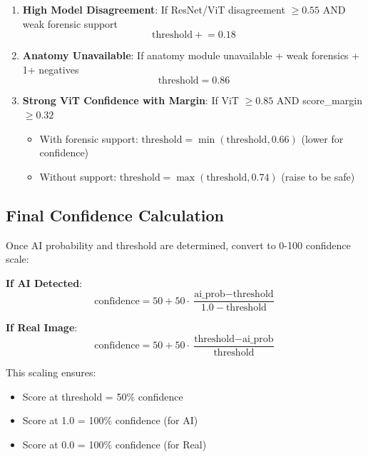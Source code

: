 \documentclass[12pt,a4paper]{book}
\begin{document}
\begin{enumerate}
    \item \textbf{High Model Disagreement}: If ResNet/ViT disagreement $\geq 0.55$ AND weak forensic support
    \begin{equation}
    \text{threshold} \mathrel{+}= 0.18
    \end{equation}
    
    \item \textbf{Anatomy Unavailable}: If anatomy module unavailable + weak forensics + 1+ negatives
    \begin{equation}
    \text{threshold} = 0.86
    \end{equation}
    
    \item \textbf{Strong ViT Confidence with Margin}: If ViT $\geq 0.85$ AND score\_margin $\geq 0.32$
    \begin{itemize}
        \item With forensic support: $\text{threshold} = \min(\text{threshold}, 0.66)$ (lower for confidence)
        \item Without support: $\text{threshold} = \max(\text{threshold}, 0.74)$ (raise to be safe)
    \end{itemize}
\end{enumerate}

\subsection{Final Confidence Calculation}

Once AI probability and threshold are determined, convert to 0-100 confidence scale:

\textbf{If AI Detected}:
\begin{equation}
\text{confidence} = 50 + 50 \cdot \frac{\text{ai\_prob} - \text{threshold}}{1.0 - \text{threshold}}
\end{equation}

\textbf{If Real Image}:
\begin{equation}
\text{confidence} = 50 + 50 \cdot \frac{\text{threshold} - \text{ai\_prob}}{\text{threshold}}
\end{equation}

This scaling ensures:
\begin{itemize}
    \item Score at threshold = 50\% confidence
    \item Score at 1.0 = 100\% confidence (for AI)
    \item Score at 0.0 = 100\% confidence (for Real)
\end{itemize}
\end{document}
